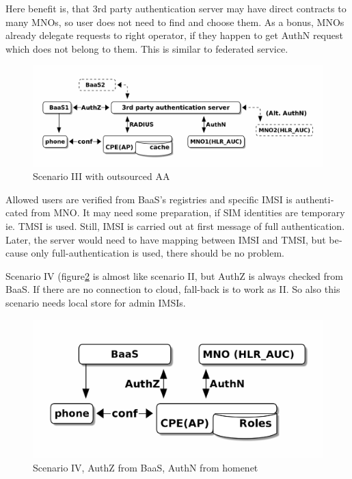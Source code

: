 \documentclass[12pt,a4paper,english]{tutthesis}
\begin{document}
\begin{otherlanguage}{english}
Here benefit is, that 3rd party authentication server may have direct
contracts to many MNOs, so user does not need to find and choose
them. As a bonus,  MNOs already delegate requests to right operator, if
they happen to get AuthN request which does not belong to them.
This is similar to federated service.

\begin{figure}[htb]
\centering
\includegraphics[width=.9\linewidth]{scenIII.png}
\caption{\label{fig:scenario-III}Scenario III with outsourced AA}
\end{figure}

Allowed users are verified from BaaS's registries and specific IMSI is
authenticated from MNO.  It may need some preparation, if SIM
identities are temporary ie. TMSI is used.  Still, IMSI is carried out at first message
of full authentication. Later, the server would need to have mapping
between IMSI and TMSI, but because only full-authentication is used,
there should be no problem.


\label{scenario-iv} 


Scenario IV (figure\ref{fig:scenario-IV} is almost like scenario II, but
AuthZ is always checked from BaaS. If there are no connection to
cloud, fall-back is to work as II. So also this scenario needs local
store for admin IMSIs.

\begin{figure}[htb]
\centering
\includegraphics[width=.9\linewidth]{scenIV.png}
\caption{\label{fig:scenario-IV}Scenario IV, AuthZ from BaaS, AuthN from homenet}
\end{figure}


\end{otherlanguage}
\end{document}
